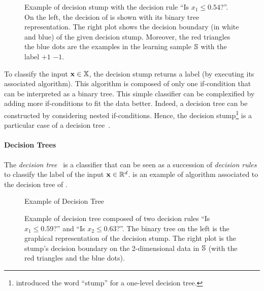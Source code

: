 \begin{figure}[H]
    \centering
    
    \caption[Example of Decision Stump]{Example of decision stump with the decision rule ``Is $x_1 \le 0.54$?''.
    On the left, the decision of  is shown with its binary tree representation.
    The right plot shows the decision boundary (in white and blue) of the given decision stump.
    Moreover, the red triangles \resp the blue dots are the examples in the learning sample $\S$ with the label $+1$ \resp $-1$. 
    }
    \label{chap:intro:fig:stump}
\end{figure}

To classify the input $\x\in\X$, the decision stump returns a label (by executing its associated algorithm). 
This algorithm is composed of only one if-condition that can be interpreted as a binary tree.
This simple classifier can be complexified by adding more if-conditions to fit the data better.
Indeed, a decision tree can be constructed by considering nested if-conditions.
Hence, the decision stump\footnote{\citet{IbaLangley1992} introduced the word ``stump'' for a one-level decision tree.} is a particular case of a decision tree~\citep{BreimanFriedmanOlshenStone1984}.

\paragraph{Decision Trees}

The {\it decision tree}~\citep{BreimanFriedmanOlshenStone1984} is a classifier that can be seen as a succession of {\it decision rules} to classify the label of the input $\x\in\R^\d$.
 is an example of algorithm associated to the decision tree of .
 
\begin{figure}[H]
    \centering
\begin{algorithm}[H]
 \caption{Example of Decision Tree}
  \begin{algorithmic}
        \Else
        \EndIf
    \Else
    \EndIf
  \end{algorithmic}
  \label{chap:mv:algo:decision-tree}
\end{algorithm}
    
    \caption[Example of Decision Tree]{Example of decision tree composed of two decision rules ``Is $x_1\le 0.59$?'' and ``Is $x_2\le 0.63$?''.
    The binary tree on the left is the graphical representation of the decision stump.
    The right plot is the stump's decision boundary on the 2-dimensional data in $\S$ (with the red triangles and the blue dots).}
    \label{chap:mv:fig:tree}
\end{figure}

